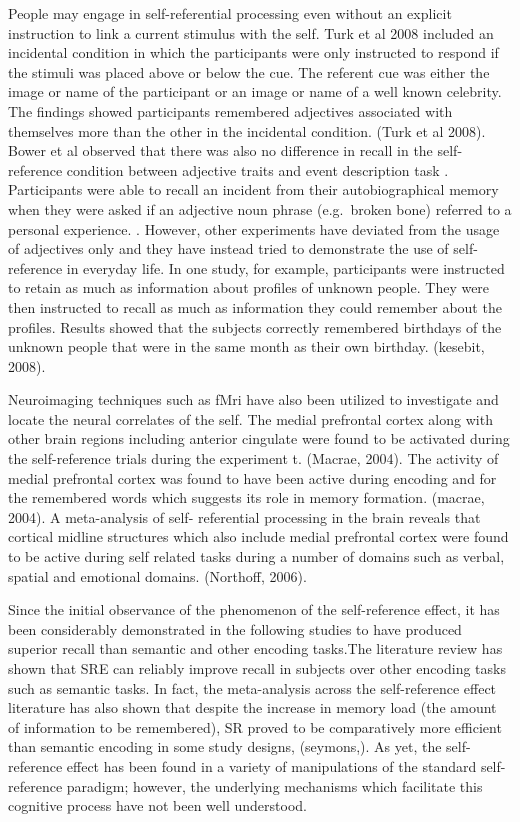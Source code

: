 \documentclass[
  man,floatsintext]{apa6}
\begin{document}
People may engage in self-referential processing even without an explicit instruction to link a current stimulus with the self. Turk et al 2008 included an incidental condition in which the participants were only instructed to respond if the stimuli was placed above or below the cue. The referent cue was either the image or name of the participant or an image or name of a well known celebrity. The findings showed participants remembered adjectives associated with themselves more than the other in the incidental condition. (Turk et al 2008). Bower et al observed that there was also no difference in recall in the self-reference condition between adjective traits and event description task . Participants were able to recall an incident from their autobiographical memory when they were asked if an adjective noun phrase (e.g.~broken bone) referred to a personal experience. . However, other experiments have deviated from the usage of adjectives only and they have instead tried to demonstrate the use of self-reference in everyday life. In one study, for example, participants were instructed to retain as much as information about profiles of unknown people. They were then instructed to recall as much as information they could remember about the profiles. Results showed that the subjects correctly remembered birthdays of the unknown people that were in the same month as their own birthday. (kesebit, 2008).

Neuroimaging techniques such as fMri have also been utilized to investigate and locate the neural correlates of the self. The medial prefrontal cortex along with other brain regions including anterior cingulate were found to be activated during the self-reference trials during the experiment t. (Macrae, 2004). The activity of medial prefrontal cortex was found to have been active during encoding and for the remembered words which suggests its role in memory formation. (macrae, 2004). A meta-analysis of self- referential processing in the brain reveals that cortical midline structures which also include medial prefrontal cortex were found to be active during self related tasks during a number of domains such as verbal, spatial and emotional domains. (Northoff, 2006).

Since the initial observance of the phenomenon of the self-reference effect, it has been considerably demonstrated in the following studies to have produced superior recall than semantic and other encoding tasks.The literature review has shown that SRE can reliably improve recall in subjects over other encoding tasks such as semantic tasks. In fact, the meta-analysis across the self-reference effect literature has also shown that despite the increase in memory load (the amount of information to be remembered), SR proved to be comparatively more efficient than semantic encoding in some study designs, (seymons,). As yet, the self-reference effect has been found in a variety of manipulations of the standard self-reference paradigm; however, the underlying mechanisms which facilitate this cognitive process have not been well understood.
\end{document}
